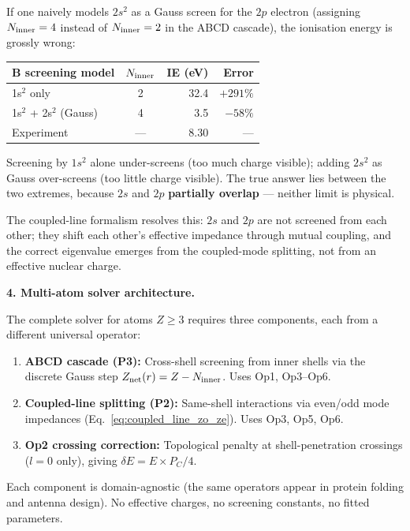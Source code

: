 If one naively models $2s^2$ as a Gauss screen for
the $2p$ electron (assigning $N_{\rm inner} = 4$
instead of $N_{\rm inner} = 2$ in the ABCD cascade),
the ionisation energy is grossly wrong:
\begin{center}
\small
\begin{tabular}{l c r r}
\hline
\textbf{B screening model} &
$N_{\rm inner}$ &
\textbf{IE (eV)} &
\textbf{Error} \\
\hline
1s$^2$ only & 2 & 32.4 & $+291\%$ \\
1s$^2$ + 2s$^2$ (Gauss) & 4 & 3.5 & $-58\%$ \\
Experiment & --- & 8.30 & --- \\
\hline
\end{tabular}
\end{center}
\noindent Screening by $1s^2$ alone under-screens
(too much charge visible); adding $2s^2$ as Gauss
over-screens (too little charge visible).
The true answer lies between the two extremes,
because $2s$ and $2p$ \textbf{partially overlap}
--- neither limit is physical.

The coupled-line formalism resolves this: $2s$ and
$2p$ are not screened from each other; they shift
each other's effective impedance through mutual
coupling, and the correct eigenvalue emerges from
the coupled-mode splitting, not from an effective
nuclear charge.

\noindent\textbf{4. Multi-atom solver architecture.}

The complete solver for atoms $Z \geq 3$ requires
three components, each from a different universal
operator:
\begin{enumerate}
    \item \textbf{ABCD cascade (P3):}
          Cross-shell screening from inner shells
          via the discrete Gauss step
          $Z_{\rm net}(r) = Z - N_{\rm inner}$.
          Uses Op1, Op3--Op6.
    \item \textbf{Coupled-line splitting (P2):}
          Same-shell interactions via even/odd
          mode impedances
          (Eq.~\ref{eq:coupled_line_zo_ze}).
          Uses Op3, Op5, Op6.
    \item \textbf{Op2 crossing correction:}
          Topological penalty at shell-penetration
          crossings ($l{=}0$ only), giving
          $\delta E = E \times P_C/4$.
\end{enumerate}
Each component is domain-agnostic (the same
operators appear in protein folding and antenna
design).  No effective charges, no screening
constants, no fitted parameters.

